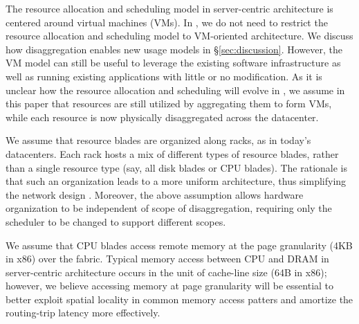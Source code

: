 The resource allocation and scheduling model in server-centric architecture is centered around virtual machines (VMs). In \dis, we do not need to restrict the resource allocation and scheduling model to VM-oriented architecture. We discuss how disaggregation enables new usage models in \S\ref{sec:discussion}. However, the VM model can still be useful to leverage the existing software infrastructure as well as running existing applications with little or no modification. As it is unclear how the resource allocation and scheduling will evolve in \dis, we assume in this paper that resources are still utilized by aggregating them to form VMs, while each resource is now physically disaggregated across the datacenter.

We assume that resource blades are organized along racks, as in today's datacenters. Each rack hosts a mix of different types of resource blades, rather than a single resource type (say, all disk blades or CPU blades). The rationale is that such an organization leads to a more uniform architecture, thus simplifying the network design . Moreover, the above assumption allows hardware organization to be independent of scope of disaggregation, requiring only the scheduler to be changed to support different scopes.  

We assume that CPU blades access remote memory at the page granularity (4KB in x86) over the fabric. Typical memory access between CPU and DRAM in server-centric architecture occurs in the unit of cache-line size (64B in x86); however, we believe accessing memory at page granularity will be essential to better exploit spatial locality in common memory access patters and amortize the routing-trip latency more effectively. 

